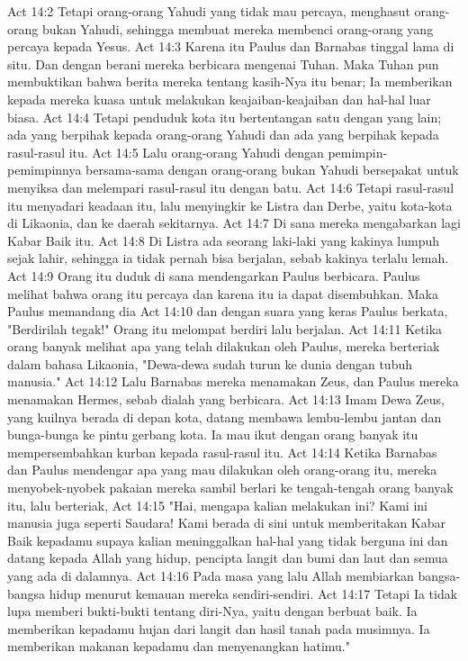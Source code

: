 Act 14:2  Tetapi orang-orang Yahudi yang tidak mau percaya, menghasut orang-orang bukan Yahudi, sehingga membuat mereka membenci orang-orang yang percaya kepada Yesus.
Act 14:3  Karena itu Paulus dan Barnabas tinggal lama di situ. Dan dengan berani mereka berbicara mengenai Tuhan. Maka Tuhan pun membuktikan bahwa berita mereka tentang kasih-Nya itu benar; Ia memberikan kepada mereka kuasa untuk melakukan keajaiban-keajaiban dan hal-hal luar biasa.
Act 14:4  Tetapi penduduk kota itu bertentangan satu dengan yang lain; ada yang berpihak kepada orang-orang Yahudi dan ada yang berpihak kepada rasul-rasul itu.
Act 14:5  Lalu orang-orang Yahudi dengan pemimpin-pemimpinnya bersama-sama dengan orang-orang bukan Yahudi bersepakat untuk menyiksa dan melempari rasul-rasul itu dengan batu.
Act 14:6  Tetapi rasul-rasul itu menyadari keadaan itu, lalu menyingkir ke Listra dan Derbe, yaitu kota-kota di Likaonia, dan ke daerah sekitarnya.
Act 14:7  Di sana mereka mengabarkan lagi Kabar Baik itu.
Act 14:8  Di Listra ada seorang laki-laki yang kakinya lumpuh sejak lahir, sehingga ia tidak pernah bisa berjalan, sebab kakinya terlalu lemah.
Act 14:9  Orang itu duduk di sana mendengarkan Paulus berbicara. Paulus melihat bahwa orang itu percaya dan karena itu ia dapat disembuhkan. Maka Paulus memandang dia
Act 14:10  dan dengan suara yang keras Paulus berkata, "Berdirilah tegak!" Orang itu melompat berdiri lalu berjalan.
Act 14:11  Ketika orang banyak melihat apa yang telah dilakukan oleh Paulus, mereka berteriak dalam bahasa Likaonia, "Dewa-dewa sudah turun ke dunia dengan tubuh manusia."
Act 14:12  Lalu Barnabas mereka menamakan Zeus, dan Paulus mereka menamakan Hermes, sebab dialah yang berbicara.
Act 14:13  Imam Dewa Zeus, yang kuilnya berada di depan kota, datang membawa lembu-lembu jantan dan bunga-bunga ke pintu gerbang kota. Ia mau ikut dengan orang banyak itu mempersembahkan kurban kepada rasul-rasul itu.
Act 14:14  Ketika Barnabas dan Paulus mendengar apa yang mau dilakukan oleh orang-orang itu, mereka menyobek-nyobek pakaian mereka sambil berlari ke tengah-tengah orang banyak itu, lalu berteriak,
Act 14:15  "Hai, mengapa kalian melakukan ini? Kami ini manusia juga seperti Saudara! Kami berada di sini untuk memberitakan Kabar Baik kepadamu supaya kalian meninggalkan hal-hal yang tidak berguna ini dan datang kepada Allah yang hidup, pencipta langit dan bumi dan laut dan semua yang ada di dalamnya.
Act 14:16  Pada masa yang lalu Allah membiarkan bangsa-bangsa hidup menurut kemauan mereka sendiri-sendiri.
Act 14:17  Tetapi Ia tidak lupa memberi bukti-bukti tentang diri-Nya, yaitu dengan berbuat baik. Ia memberikan kepadamu hujan dari langit dan hasil tanah pada musimnya. Ia memberikan makanan kepadamu dan menyenangkan hatimu."
